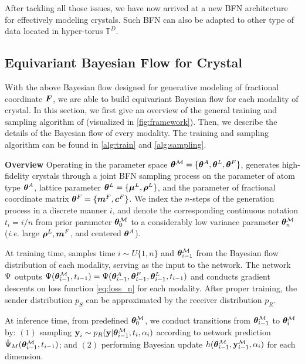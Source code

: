 After tackling all those issues, we have now arrived at a new BFN architecture for effectively modeling crystals. Such BFN can also be adapted to other type of data located in hyper-torus $\mathbb{T}^{D}$.

\subsection{Equivariant Bayesian Flow for Crystal}
With the above Bayesian flow designed for generative modeling of fractional coordinate ${\bm{F}}$, we are able to build equivariant Bayesian flow for each modality of crystal. In this section, we first give an overview of the general training and sampling algorithm of \modelname (visualized in \cref{fig:framework}). Then, we describe the details of the Bayesian flow of every modality. The training and sampling algorithm can be found in \cref{alg:train} and \cref{alg:sampling}.

\textbf{Overview} Operating in the parameter space $\bm{\theta}^\mathcal{M}=\{\bm{\theta}^A,\bm{\theta}^L,\bm{\theta}^F\}$, \modelname generates high-fidelity crystals through a joint BFN sampling process on the parameter of  atom type $\bm{\theta}^A$, lattice parameter $\boldsymbol{\theta}^L=\{\bm{\mu}^L,\bm{\rho}^L\}$, and the parameter of fractional coordinate matrix $\bm{\theta}^F=\{\bm{m}^F,\bm{c}^F\}$. We index the $n$-steps of the generation process in a discrete manner $i$, and denote the corresponding continuous notation $t_i=i/n$ from prior parameter $\bm{\theta}^\mathcal{M}_0$ to a considerably low variance parameter $\bm{\theta}^\mathcal{M}_n$ (\emph{i.e.} large ${\bm{\rho}}^L,\bm{m}^F$, and centered $\bm{\theta}^A$).

At training time, \modelname samples time $i\sim U\{1,n\}$ and $\bm{\theta}^\mathcal{M}_{i-1}$ from the Bayesian flow distribution of each modality, serving as the input to the network. The network $\Psi$ outputs $\Psi(\boldsymbol{\theta}_{i-1}^\mathcal{M},t_{i-1})=\Psi(\boldsymbol{\theta}_{i-1}^A,\boldsymbol{\theta}_{i-1}^F,\boldsymbol{\theta}_{i-1}^L,t_{i-1})$ and conducts gradient descents on loss function \cref{eq:loss_n} for each modality. After proper training, the sender distribution $p_S$ can be approximated by the receiver distribution $p_R$. 

At inference time, from predefined $\bm{\theta}^\mathcal{M}_0$, we conduct transitions from $\bm{\theta}^\mathcal{M}_{i-1}$ to $\bm{\theta}^\mathcal{M}_{i}$ by: $(1)$ sampling $\operatorname{\mathbf{y}}_i\sim p_R(\bold{y}|\bm{\theta}^\mathcal{M}_{i-1};t_i,\alpha_i)$ according to network prediction $\hat{\Psi}_M(\bm{\theta}^\mathcal{M}_{i-1}, t_{i-1})$; and $(2)$ performing Bayesian update $h(\bm{\theta}^\mathcal{M}_{i-1},\operatorname{\mathbf{y}}^{\mathcal{M}}_{i-1},\alpha_i)$ for each dimension. 


